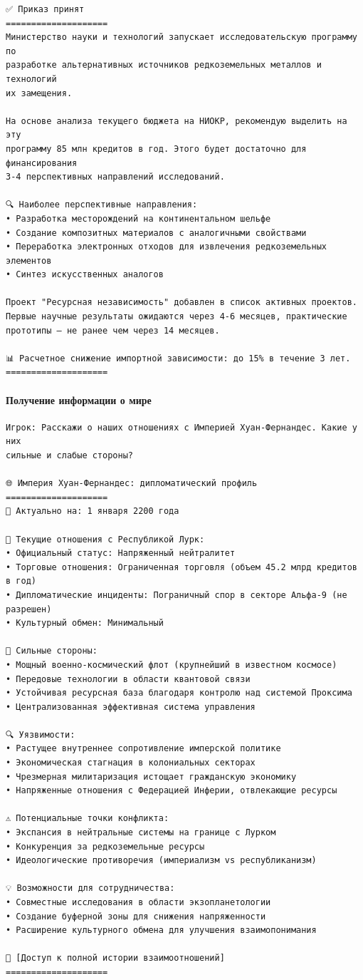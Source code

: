 \begin{verbatim}
✅ Приказ принят
====================
Министерство науки и технологий запускает исследовательскую программу по
разработке альтернативных источников редкоземельных металлов и технологий
их замещения.

На основе анализа текущего бюджета на НИОКР, рекомендую выделить на эту
программу 85 млн кредитов в год. Этого будет достаточно для финансирования
3-4 перспективных направлений исследований.

🔍 Наиболее перспективные направления:
• Разработка месторождений на континентальном шельфе
• Создание композитных материалов с аналогичными свойствами
• Переработка электронных отходов для извлечения редкоземельных элементов
• Синтез искусственных аналогов

Проект "Ресурсная независимость" добавлен в список активных проектов.
Первые научные результаты ожидаются через 4-6 месяцев, практические
прототипы — не ранее чем через 14 месяцев.

📊 Расчетное снижение импортной зависимости: до 15% в течение 3 лет.
====================
\end{verbatim}

\paragraph{Получение информации о мире}

\begin{verbatim}
Игрок: Расскажи о наших отношениях с Империей Хуан-Фернандес. Какие у них
сильные и слабые стороны?

🌐 Империя Хуан-Фернандес: дипломатический профиль
====================
📅 Актуально на: 1 января 2200 года

🤝 Текущие отношения с Республикой Лурк:
• Официальный статус: Напряженный нейтралитет
• Торговые отношения: Ограниченная торговля (объем 45.2 млрд кредитов в год)
• Дипломатические инциденты: Пограничный спор в секторе Альфа-9 (не разрешен)
• Культурный обмен: Минимальный

💪 Сильные стороны:
• Мощный военно-космический флот (крупнейший в известном космосе)
• Передовые технологии в области квантовой связи
• Устойчивая ресурсная база благодаря контролю над системой Проксима
• Централизованная эффективная система управления

🔍 Уязвимости:
• Растущее внутреннее сопротивление имперской политике
• Экономическая стагнация в колониальных секторах
• Чрезмерная милитаризация истощает гражданскую экономику
• Напряженные отношения с Федерацией Инферии, отвлекающие ресурсы

⚠️ Потенциальные точки конфликта:
• Экспансия в нейтральные системы на границе с Лурком
• Конкуренция за редкоземельные ресурсы
• Идеологические противоречия (империализм vs республиканизм)

💡 Возможности для сотрудничества:
• Совместные исследования в области экзопланетологии
• Создание буферной зоны для снижения напряженности
• Расширение культурного обмена для улучшения взаимопонимания

📜 [Доступ к полной истории взаимоотношений]
====================
\end{verbatim}

